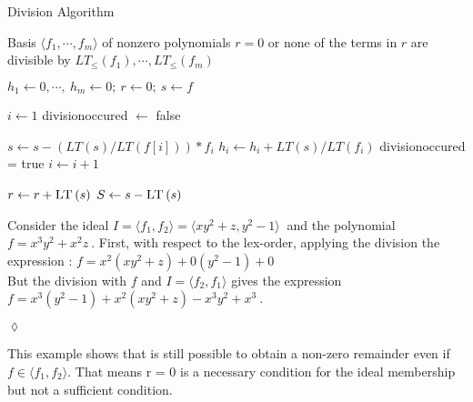 \newpage


\begin{algorithm}
\caption{Division Algorithm \cite{KHZ}}
\label{alg:division}
\begin{algorithmic}[1]

\Require Basis $\langle f_{1}, \cdots, f_{m}\rangle$ of nonzero polynomials  
\Ensure $r=0$ or none of the terms in $r$ are divisible by $ LT_{\leq}\left( f_{1}\right) , \cdots , LT_{\leq} \left( f_{m}\right) $

\State $ h_{1} \gets 0 , \cdots ,~h_{m} \gets 0;~r \gets 0;~s \gets f  $

\State $ i \gets 1 $
\State  division\textunderscore occured $ \gets $  false 

\State $ s \gets s - ( LT \left( s\right)/ LT \left( f \left[ i\right] \right))  \ast f_{i} $
\State $h_{i} \gets h_{i} + LT\left( s\right) / LT\left( f_{i}\right) $
\State division\textunderscore occured = true
\Else
\State $i \gets i+1$
\EndIf
\EndWhile

\State $ r \gets r + \textsc{LT}\left( s\right) $
\State $ S \gets s - \textsc{LT}\left( s\right) $
\EndIf

\EndWhile


\end{algorithmic}
\end{algorithm}


\begin{env_example}\normalfont
Consider the ideal $I = \langle f_{1},f_{2} \rangle = \langle xy^{2}+z,y^{2}-1 \rangle~$
and the polynomial $f = x^{3}y^{2}+x^{2}z~$.
First, with respect to the lex-order, applying the division the expression : $f = x^{2}(xy^{2}+z) + 0(y^{2}-1) + 0$ \\
But the division with $f$ and $I = \langle f_{2},f_{1} \rangle$ gives the expression \\ $f = x^{3}(y^{2}-1) + x^{2}(xy^{2}+z) -x^{3}y^{2}+x^{3}~$.
\begin{flushright}
$\lozenge$
\end{flushright}
\end{env_example}



This example shows that is still possible to obtain a non-zero remainder even if $f \in \langle f_{1},f_{2} \rangle $. That means r = 0 is a  necessary condition for the ideal membership but not a sufficient condition.
